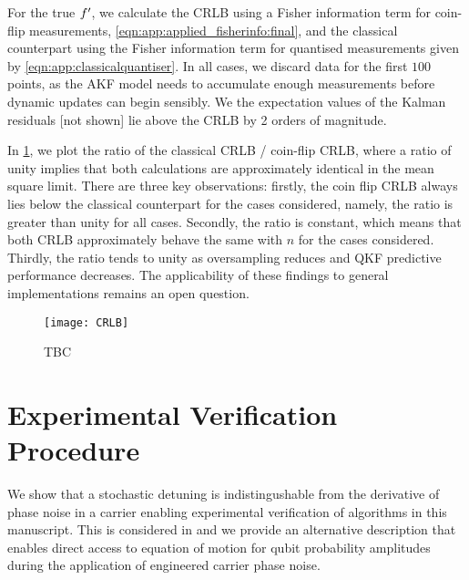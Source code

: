 For the true $f'$, we calculate the CRLB using a Fisher information term for coin-flip measurements, \cref{eqn:app:applied_fisherinfo:final}, and the classical counterpart using the Fisher information term for quantised measurements given by \cref{eqn:app:classicalquantiser}. In all cases, we discard data for the first $100$ points, as the AKF model needs to accumulate enough measurements before dynamic updates can begin sensibly. We the expectation values of the Kalman residuals [not shown] lie above the CRLB by 2 orders of magnitude.  

In \cref{fig:app:CRLB}, we plot the ratio of the classical CRLB / coin-flip CRLB, where a ratio of unity implies that both calculations are approximately identical in the mean square limit. There are three key observations: firstly, the coin flip CRLB always lies below the classical counterpart for the cases considered, namely, the ratio is greater than unity for all cases. Secondly, the ratio is constant, which means that both CRLB approximately behave the same with $n$ for the cases considered. Thirdly, the ratio tends to unity as oversampling reduces and QKF predictive performance decreases. The applicability of these findings to general implementations remains an open question. 

\begin{figure}[h!]
    \texttt{[image: CRLB]} 
    \caption{ \label{fig:app:CRLB} TBC}
\end{figure}
\FloatBarrier
\newpage
\section{Experimental Verification Procedure \label{sec:app:exptverfication}}

We show that a stochastic detuning is indistingushable from the derivative of phase noise in a carrier enabling experimental verification of algorithms in this manuscript.
This is considered in \cite{soare2014} and we provide an alternative description that enables direct access to equation of motion for qubit probability amplitudes during the application of engineered carrier phase noise. 

